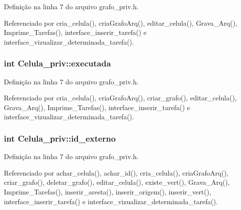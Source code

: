 Definição na linha 7 do arquivo grafo\+\_\+priv.\+h.



Referenciado por cria\+\_\+celula(), cria\+Grafo\+Arq(), editar\+\_\+celula(), Grava\+\_\+\+Arq(), Imprime\+\_\+\+Tarefas(), interface\+\_\+inserir\+\_\+tarefa() e interface\+\_\+vizualizar\+\_\+determinada\+\_\+tarefa().

\hypertarget{structCelula__priv_af5f995caad41372e844f965021c5d183}{}
\subsubsection[{executada}]{\setlength{\rightskip}{0pt plus 5cm}int Celula\+\_\+priv\+::executada}\label{structCelula__priv_af5f995caad41372e844f965021c5d183}


Definição na linha 7 do arquivo grafo\+\_\+priv.\+h.



Referenciado por cria\+\_\+celula(), cria\+Grafo\+Arq(), criar\+\_\+grafo(), editar\+\_\+celula(), Grava\+\_\+\+Arq(), Imprime\+\_\+\+Tarefas(), interface\+\_\+inserir\+\_\+tarefa() e interface\+\_\+vizualizar\+\_\+determinada\+\_\+tarefa().

\hypertarget{structCelula__priv_a78a8525da28e1918d0faaf127001bd7b}{}
\subsubsection[{id\+\_\+externo}]{\setlength{\rightskip}{0pt plus 5cm}int Celula\+\_\+priv\+::id\+\_\+externo}\label{structCelula__priv_a78a8525da28e1918d0faaf127001bd7b}


Definição na linha 7 do arquivo grafo\+\_\+priv.\+h.



Referenciado por achar\+\_\+celula(), achar\+\_\+id(), cria\+\_\+celula(), cria\+Grafo\+Arq(), criar\+\_\+grafo(), deletar\+\_\+grafo(), editar\+\_\+celula(), existe\+\_\+vert(), Grava\+\_\+\+Arq(), Imprime\+\_\+\+Tarefas(), inserir\+\_\+aresta(), inserir\+\_\+origem(), inserir\+\_\+vert(), interface\+\_\+inserir\+\_\+tarefa() e interface\+\_\+vizualizar\+\_\+determinada\+\_\+tarefa().

\hypertarget{structCelula__priv_a3c49601fe078bd7bb1512f0107af5301}{}
